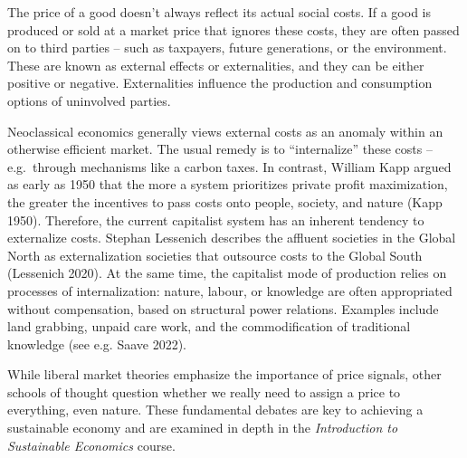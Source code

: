 \documentclass[
  a4paper,
  DIV=11,
  numbers=noendperiod,
  oneside,
  openany]{scrreprt}
\begin{document}
\begin{tcolorbox}[enhanced jigsaw, arc=.35mm, bottomrule=.15mm, bottomtitle=1mm, breakable, colback=white, colbacktitle=quarto-callout-note-color!10!white, colframe=quarto-callout-note-color-frame, coltitle=black, left=2mm, leftrule=.75mm, opacityback=0, opacitybacktitle=0.6, rightrule=.15mm, title={Internalizing and externalizing}, titlerule=0mm, toprule=.15mm, toptitle=1mm]

The price of a good doesn't always reflect its actual social costs. If a
good is produced or sold at a market price that ignores these costs,
they are often passed on to third parties -- such as taxpayers, future
generations, or the environment. These are known as external effects or
externalities, and they can be either positive or negative.
Externalities influence the production and consumption options of
uninvolved parties.

Neoclassical economics generally views external costs as an anomaly
within an otherwise efficient market. The usual remedy is to
``internalize'' these costs -- e.g.~through mechanisms like a carbon
taxes. In contrast, William Kapp argued as early as 1950 that the more a
system prioritizes private profit maximization, the greater the
incentives to pass costs onto people, society, and nature (Kapp 1950).
Therefore, the current capitalist system has an inherent tendency to
externalize costs. Stephan Lessenich describes the affluent societies in
the Global North as externalization societies that outsource costs to
the Global South (Lessenich 2020). At the same time, the capitalist mode
of production relies on processes of internalization: nature, labour, or
knowledge are often appropriated without compensation, based on
structural power relations. Examples include land grabbing, unpaid care
work, and the commodification of traditional knowledge (see e.g. Saave
2022).

While liberal market theories emphasize the importance of price signals,
other schools of thought question whether we really need to assign a
price to everything, even nature. These fundamental debates are key to
achieving a sustainable economy and are examined in depth in the
\emph{Introduction to Sustainable Economics} course.

\end{tcolorbox}
\end{document}
